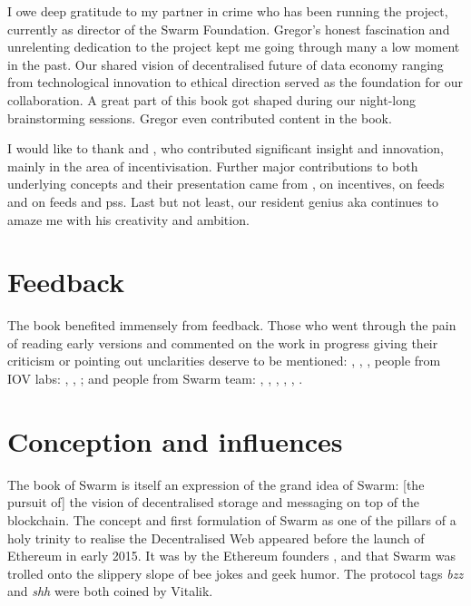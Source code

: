 I owe deep gratitude to my partner in crime  who has been running the project, currently as director of the Swarm Foundation. Gregor's honest fascination and unrelenting dedication to the project  kept me going through many a low moment in the past. Our shared vision of decentralised future of data economy ranging from technological innovation to ethical direction served as the foundation for our collaboration. A great part of this book got shaped during our night-long brainstorming sessions. Gregor even contributed content in the book.

I would like to thank  and , who contributed significant insight and innovation, mainly in the area of incentivisation. 
Further major contributions to both underlying concepts and their presentation came from ,  on incentives,  
 on feeds and  on feeds and pss. Last but not least, our resident genius  aka 
continues to amaze me with his creativity and ambition.

\section*{Feedback}

The book benefited immensely from feedback. Those who went through the pain of reading early versions and commented on the work in progress giving their criticism or pointing out unclarities deserve to be mentioned: , , ,  people from IOV labs:  , , ;
and people from Swarm team:
, 
, ,  , , .



\section*{Conception and influences}

The book of Swarm is itself an expression of the grand idea of Swarm: [the pursuit of] the vision of decentralised storage and messaging on top of the blockchain. The concept and first formulation of Swarm as one of the pillars of a holy trinity to realise the Decentralised Web appeared before the launch of Ethereum in early 2015. It was by the Ethereum founders ,  and  that Swarm was trolled onto the slippery slope of bee jokes and geek humor. The protocol tags \emph{bzz} and \emph{shh} were both coined by Vitalik. 

